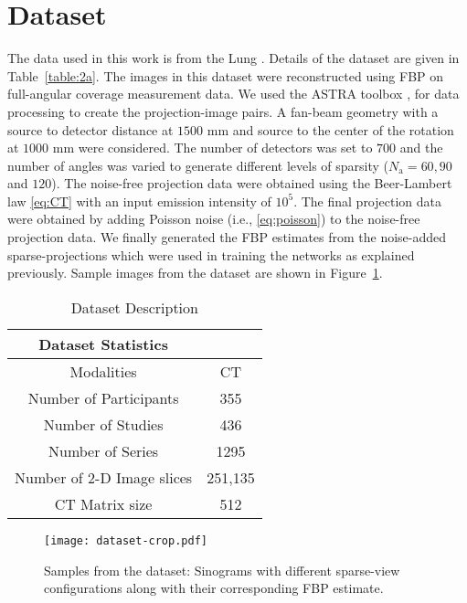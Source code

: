 \section{Dataset}
The data used in this work is from the \ac{Lung} \cite{Lung20,clark2013cancer}. Details of the dataset are given in Table~\ref{table:2a}. The images in this dataset were reconstructed using \ac{FBP} on full-angular coverage measurement data. We used the ASTRA toolbox \cite{van2016fast}, for data processing to create the projection-image pairs.  A fan-beam geometry with a source to detector distance at $1500$ mm and source to the center of the rotation at $1000$ mm were considered. The number of detectors was set to $700$ and the number of angles was varied to generate different levels of sparsity ($N_\mathrm{a}=60,90$ and $120$). The noise-free projection data were obtained using the Beer-Lambert law \eqref{eq:CT} with an input emission intensity of $10^5$. The final projection data were obtained by adding Poisson noise (i.e., \eqref{eq:poisson}) to the noise-free projection data. We finally generated the \ac{FBP} estimates from the noise-added sparse-projections which were used in training the networks as explained previously. Sample images from the dataset are shown in Figure~\ref{fig:data}. 



\begin{table}[ht!]
	\caption{Dataset Description}
	\label{table:1}
	\centering
	\begin{tabular}{||c|c||} 
		\hline
		Dataset Statistics &  \\ [0.5ex] 
		\hline
		Modalities & CT   \\ 
		\hline
		Number of Participants  & 355  \\
		\hline
		Number of Studies  & 436  \\
		\hline
		Number of Series & 1295 \\ 
		\hline
		Number of 2-D Image slices & 251,135 \\ 
		\hline
		CT Matrix size & 512 \\ 
		\hline
		
	\end{tabular}
	
\end{table}


\begin{figure}[!htbp]
	\centering
	\texttt{[image: dataset-crop.pdf]}
	\caption{Samples from the dataset: Sinograms with different sparse-view configurations along with their corresponding \ac{FBP} estimate.}
	\label{fig:data}
\end{figure}

